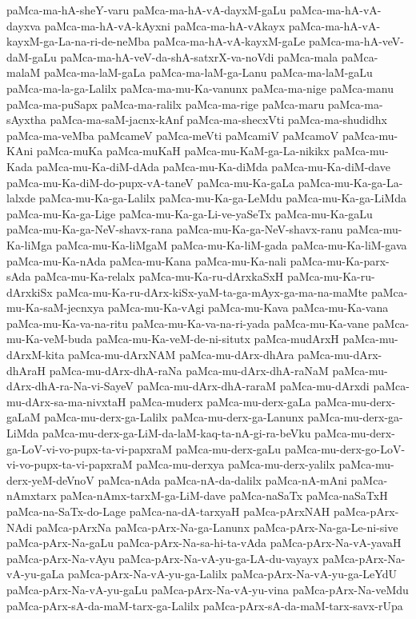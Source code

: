 {paMca-ma-hA-sheY-varu
paMca-ma-hA-vA-dayxM-gaLu
paMca-ma-hA-vA-dayxva
paMca-ma-hA-vA-kAyxni
paMca-ma-hA-vAkayx
paMca-ma-hA-vA-kayxM-ga-La-na-ri-de-neMba
paMca-ma-hA-vA-kayxM-gaLe
paMca-ma-hA-veV-daM-gaLu
paMca-ma-hA-veV-da-shA-satxrX-va-noVdi
paMca-mala
paMca-malaM
paMca-ma-laM-gaLa
paMca-ma-laM-ga-Lanu
paMca-ma-laM-gaLu
paMca-ma-la-ga-Lalilx
paMca-ma-mu-Ka-vanunx
paMca-ma-nige
paMca-manu
paMca-ma-puSapx
paMca-ma-ralilx
paMca-ma-rige
paMca-maru
paMca-ma-sAyxtha
paMca-ma-saM-jacnx-kAnf
paMca-ma-shecxVti
paMca-ma-shudidhx
paMca-ma-veMba
paMcameV
paMca-meVti
paMcamiV
paMcamoV
paMca-mu-KAni
paMca-muKa
paMca-muKaH
paMca-mu-KaM-ga-La-nikikx
paMca-mu-Kada
paMca-mu-Ka-diM-dAda
paMca-mu-Ka-diMda
paMca-mu-Ka-diM-dave
paMca-mu-Ka-diM-do-pupx-vA-taneV
paMca-mu-Ka-gaLa
paMca-mu-Ka-ga-La-lalxde
paMca-mu-Ka-ga-Lalilx
paMca-mu-Ka-ga-LeMdu
paMca-mu-Ka-ga-LiMda
paMca-mu-Ka-ga-Lige
paMca-mu-Ka-ga-Li-ve-yaSeTx
paMca-mu-Ka-gaLu
paMca-mu-Ka-ga-NeV-shavx-rana
paMca-mu-Ka-ga-NeV-shavx-ranu
paMca-mu-Ka-liMga
paMca-mu-Ka-liMgaM
paMca-mu-Ka-liM-gada
paMca-mu-Ka-liM-gava
paMca-mu-Ka-nAda
paMca-mu-Kana
paMca-mu-Ka-nali
paMca-mu-Ka-parx-sAda
paMca-mu-Ka-relalx
paMca-mu-Ka-ru-dArxkaSxH
paMca-mu-Ka-ru-dArxkiSx
paMca-mu-Ka-ru-dArx-kiSx-yaM-ta-ga-mAyx-ga-ma-na-maMte
paMca-mu-Ka-saM-jecnxya
paMca-mu-Ka-vAgi
paMca-mu-Kava
paMca-mu-Ka-vana
paMca-mu-Ka-va-na-ritu
paMca-mu-Ka-va-na-ri-yada
paMca-mu-Ka-vane
paMca-mu-Ka-veM-buda
paMca-mu-Ka-veM-de-ni-situtx
paMca-mudArxH
paMca-mu-dArxM-kita
paMca-mu-dArxNAM
paMca-mu-dArx-dhAra
paMca-mu-dArx-dhAraH
paMca-mu-dArx-dhA-raNa
paMca-mu-dArx-dhA-raNaM
paMca-mu-dArx-dhA-ra-Na-vi-SayeV
paMca-mu-dArx-dhA-raraM
paMca-mu-dArxdi
paMca-mu-dArx-sa-ma-nivxtaH
paMca-muderx
paMca-mu-derx-gaLa
paMca-mu-derx-gaLaM
paMca-mu-derx-ga-Lalilx
paMca-mu-derx-ga-Lanunx
paMca-mu-derx-ga-LiMda
paMca-mu-derx-ga-LiM-da-laM-kaq-ta-nA-gi-ra-beVku
paMca-mu-derx-ga-LoV-vi-vo-pupx-ta-vi-papxraM
paMca-mu-derx-gaLu
paMca-mu-derx-go-LoV-vi-vo-pupx-ta-vi-papxraM
paMca-mu-derxya
paMca-mu-derx-yalilx
paMca-mu-derx-yeM-deVnoV
paMca-nAda
paMca-nA-da-dalilx
paMca-nA-mAni
paMca-nAmxtarx
paMca-nAmx-tarxM-ga-LiM-dave
paMca-naSaTx
paMca-naSaTxH
paMca-na-SaTx-do-Lage
paMca-na-dA-tarxyaH
paMca-pArxNAH
paMca-pArx-NAdi
paMca-pArxNa
paMca-pArx-Na-ga-Lanunx
paMca-pArx-Na-ga-Le-ni-sive
paMca-pArx-Na-gaLu
paMca-pArx-Na-sa-hi-ta-vAda
paMca-pArx-Na-vA-yavaH
paMca-pArx-Na-vAyu
paMca-pArx-Na-vA-yu-ga-LA-du-vayayx
paMca-pArx-Na-vA-yu-gaLa
paMca-pArx-Na-vA-yu-ga-Lalilx
paMca-pArx-Na-vA-yu-ga-LeYdU
paMca-pArx-Na-vA-yu-gaLu
paMca-pArx-Na-vA-yu-vina
paMca-pArx-Na-veMdu
paMca-pArx-sA-da-maM-tarx-ga-Lalilx
paMca-pArx-sA-da-maM-tarx-savx-rUpa
}
